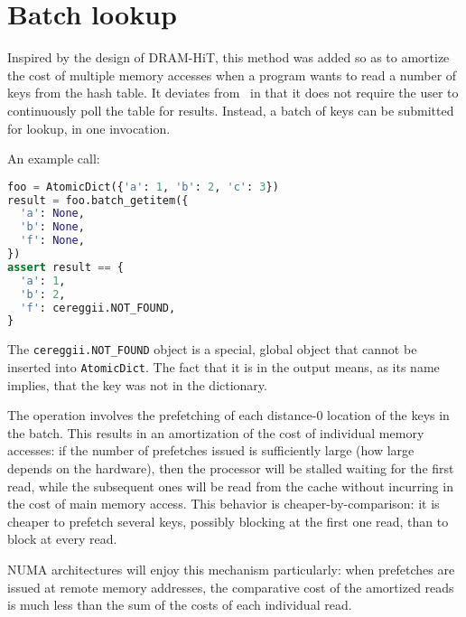 \section{Batch lookup}\label{sec:batch-lookup}

Inspired by the design of DRAM-HiT, this method was added so as to amortize the cost of multiple memory accesses when a program wants to read a number of keys from the hash table.
It deviates from~\cite{dramhit} in that it does not require the user to continuously poll the table for results.
Instead, a batch of keys can be submitted for lookup, in one invocation.

An example call:

\begin{lstlisting}[language=Python]
foo = AtomicDict({'a': 1, 'b': 2, 'c': 3})
result = foo.batch_getitem({
  'a': None,
  'b': None,
  'f': None,
})
assert result == {
  'a': 1,
  'b': 2,
  'f': cereggii.NOT_FOUND,
}
\end{lstlisting}

The \texttt{cereggii.NOT\_FOUND} object is a special, global object that cannot be inserted into \texttt{AtomicDict}.
The fact that it is in the output means, as its name implies, that the key was not in the dictionary.

The operation involves the prefetching of each distance-0 location of the keys in the batch.
This results in an amortization of the cost of individual memory accesses: if the number of prefetches issued is sufficiently large (how large depends on the hardware), then the processor will be stalled waiting for the first read, while the subsequent ones will be read from the cache without incurring in the cost of main memory access.
This behavior is cheaper-by-comparison: it is cheaper to prefetch several keys, possibly blocking at the first one read, than to block at every read.

NUMA architectures will enjoy this mechanism particularly: when prefetches are issued at remote memory addresses, the comparative cost of the amortized reads is much less than the sum of the costs of each individual read.

